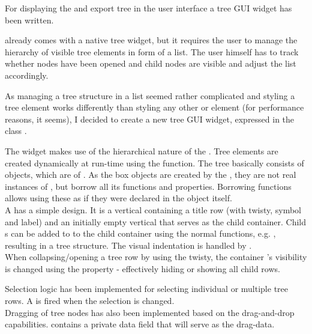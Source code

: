 For displaying the  and export tree in the user interface a tree GUI widget has been written.

 already comes with a native tree widget, but it requires the user to manage the hierarchy of visible tree elements in form of a list. The user himself has to track whether nodes have been opened and child nodes are visible and adjust the list accordingly.

As managing a tree structure in a list seemed rather complicated and styling a  tree element works differently than styling any other  or  element (for performance reasons, it seems), I decided to create a new tree GUI widget, expressed in the class .

The widget makes use of the hierarchical nature of the  . Tree elements are created dynamically at run-time using the \linebreak{} function. The tree basically consists of   objects, which are  of . As the  box objects are created by the , they are not real instances of , but borrow all its functions and properties. Borrowing functions allows using these as if they were declared in the object itself.\\
A  has a simple design. It is a vertical  containing a title row (with twisty, symbol and label) and an initially empty vertical  that serves as the child container. Child s can be added to to the child container using the normal  functions, e.g. , resulting in a tree structure. The visual indentation is handled by .\\
When collapsing/opening a tree row by using the twisty, the container 's visibility is changed using the   property - effectively hiding or showing all child rows.

Selection logic has been implemented for selecting individual or multiple tree rows. A   is fired when the selection is changed.\\
Dragging of tree nodes has also been implemented based on the  drag-and-drop capabilities.  contains a private data field that will serve as the drag-data.

